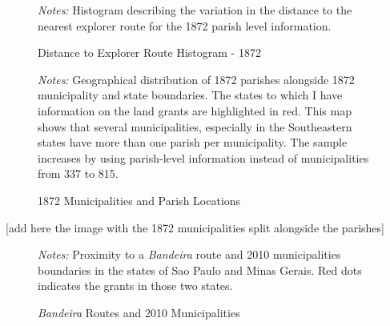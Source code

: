 \documentclass{article}
\begin{document}
\clearpage

\begin{figure}[h!]
  \caption{Distance to Explorer Route Histogram - 1872}
  \begin{center}
  \end{center}
  \textit{Notes:} Histogram describing the variation in the distance to the nearest explorer route for the 1872 parish level information.  
  \label{fig:1872_iv_hist}
\end{figure}


\clearpage

\begin{figure}[h!]
  \caption{1872 Municipalities and Parish Locations}
  \begin{center}
  \end{center}
  \textit{Notes:} Geographical distribution of 1872 parishes alongside 1872 municipality and state boundaries. The states to which I have information on the land grants are highlighted in red. This map shows that several municipalities, especially in the Southeastern states have more than one parish per municipality. The sample increases by using parish-level information instead of municipalities from 337 to 815.
  \label{fig:parishes_1872}
\end{figure}

\clearpage

[add here the image with the 1872 municipalities split alongside the parishes]

\clearpage

\begin{figure}[h!]
  \caption{\textit{Bandeira} Routes and 2010 Municipalities}
  \begin{center}
  \end{center}
  \textit{Notes:} Proximity to a \textit{Bandeira} route and 2010 municipalities boundaries in the states of Sao Paulo and Minas Gerais. Red dots indicates the grants in those two states.
  \label{fig:bandeira_dist}
\end{figure}
\end{document}
